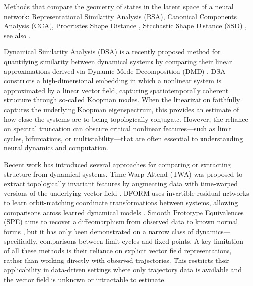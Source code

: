 \documentclass{article}
\theoremstyle{definition} \newtheorem{definition}{Definition}  \newtheorem{example}{Example}
\theoremstyle{remark} \newtheorem{remark}{Remark}
\newcounter{ct}
\begin{document}
Methods  that compare the geometry of states in the latent space of a neural network:
Representational Similarity Analysis (RSA)\citep{kriegeskorte2008representational},
Canonical Components Analysis (CCA)\citep{raghu2017svcca}, 
Procrustes Shape Distance \citep{williams2021generalized}, 
Stochastic Shape Distance (SSD) \citep{duong2022representational}  %
\citep{barbosa2025quantifying}, 
see also \citep{williams2024equivalence}. %

Dynamical Similarity Analysis (DSA) is a recently proposed method for quantifying similarity between dynamical systems by comparing their linear approximations derived via Dynamic Mode Decomposition (DMD) \citep{ostrow2024beyond}.
DSA constructs a high-dimensional embedding in which a nonlinear system is approximated by a linear vector field, capturing spatiotemporally coherent structure through so-called Koopman modes. 
When the linearization faithfully captures the underlying Koopman eigenspectrum, this provides an estimate of how close the systems are to being topologically conjugate. 
However, the reliance on spectral truncation can obscure critical nonlinear features—such as limit cycles, bifurcations, or multistability—that are often essential to understanding neural dynamics and computation.

Recent work has introduced several approaches for comparing or extracting structure from dynamical systems.
Time-Warp-Attend (TWA) was proposed to extract topologically invariant features by augmenting data with time-warped versions of the underlying vector field \citep{moriel2024timewarpattend}. DFORM uses invertible residual networks to learn orbit-matching coordinate transformations between systems, allowing comparisons across learned dynamical models \citep{chen2024dform}. %
Smooth Prototype Equivalences (SPE) aims to recover a diffeomorphism from observed data to known normal forms \citep{friedman2025characterizing}, but it has only been demonstrated on a narrow class of dynamics—specifically, comparisons between limit cycles and fixed points.
A key limitation of all these methods is their reliance on explicit vector field representations, rather than working directly with observed trajectories.
This restricts their applicability in data-driven settings where only trajectory data is available and the vector field is unknown or intractable to estimate.
\end{document}
